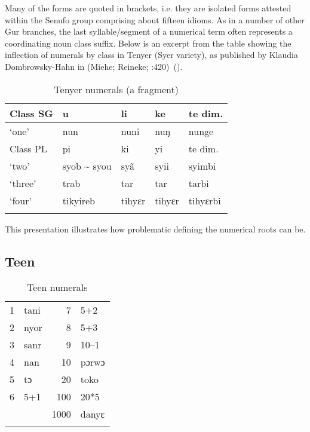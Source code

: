 Many of the forms are quoted in brackets, i.e. they are isolated forms attested within the Senufo group comprising about fifteen idioms. As in a number of other Gur branches, the last syllable/segment of a numerical term often represents a coordinating noun class suffix. Below is an excerpt from the table showing the inflection of numerals by class in Tenyer (Syer variety), as published by Klaudia Dombrowsky-Hahn in (Miehe; Reineke; \citealt{Winkelmann2007f}:420)~().

\begin{table}
\caption{\label{tab:3:182}Tenyer numerals (a fragment)}
\begin{tabularx}{\textwidth}{lXXXl}
\lsptoprule
{Class} {SG} & {u} & {li} & {ke} & {te} {dim.}\\
\midrule
‘one’ & nun & nuni & nuŋ & nunge\\
\tablevspace
{Class} {PL} & {pi} & {ki} & {yi} & {te} {dim.}\\
\midrule
‘two’ & syob {\textasciitilde} syou & sy{\~{a}} & syii & syimbi\\
‘three’ & trab & tar & tar & tarbi\\
‘four’ & tikyireb & tihyɛr & tihyɛr & tihyɛrbi\\
\lspbottomrule
\end{tabularx}
\end{table}

 \largerpage
This presentation illustrates how problematic defining the numerical roots can be.
% 

\subsection{Teen}%
\begin{table}
\caption{\label{tab:3:183}Teen numerals}


\begin{tabularx}{\textwidth}{lQrl}
\lsptoprule

1 & tani & 7 & 5+2\\
2 & nyor & 8 & 5+3\\
3 & sanr & 9 & 10--1\\
4 & nan & 10 & pɔrwɔ\\
5 & tɔ & 20 & toko\\
6 & 5+1 & 100 & 20*5\\
&  & 1000 & danyɛ\\
\lspbottomrule
\end{tabularx}
\end{table}

